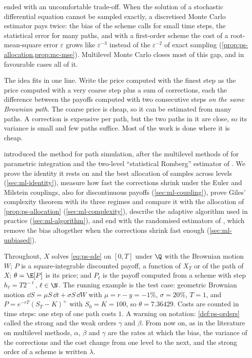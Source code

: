
 ended with an uncomfortable trade-off. When the solution of a
stochastic differential equation cannot be sampled exactly, a discretised Monte Carlo
estimator pays twice: the bias of the scheme calls for small time steps, the statistical
error for many paths, and with a first-order scheme the cost of a root-mean-square error
$\varepsilon$ grows like $\varepsilon^{-3}$ instead of the $\varepsilon^{-2}$ of exact
sampling (\cref{prop:ps-allocation,prop:mc-mse}). Multilevel Monte Carlo closes most of this
gap, and in favourable cases all of it.

The idea fits in one line. Write the price computed with the finest step as the price
computed with a very coarse step plus a sum of corrections, each the difference between the
payoffs computed with two consecutive steps \emph{on the same Brownian path}. The coarse
price is cheap, so it can be estimated from many paths. A correction is expensive per path,
but the two paths in it are close, so its variance is small and few paths suffice. Most of
the work is done where it is cheap.

 introduced the method for path simulation, after the multilevel
methods of \textcite{heinrich-mlmc} for parametric integration and the two-level
``statistical Romberg'' estimator of \textcite{kebaier-romberg}. We prove the identity it
rests on and the best allocation of samples across levels (\cref{sec:ml-identity}), measure
how fast the corrections shrink under the Euler and Milstein couplings, also for
discontinuous payoffs (\cref{sec:ml-coupling}), prove Giles' complexity theorem with its
three regimes and compare it with the allocation of \cref{prop:ps-allocation}
(\cref{sec:ml-complexity}), describe the adaptive algorithm used in practice
(\cref{sec:ml-algorithm}), and end with the randomised estimators of
\textcite{rhee-glynn}, which remove the bias altogether when the corrections shrink fast
enough (\cref{sec:ml-unbiased}).

Throughout, $X$ solves \eqref{eq:ps-sde} on $[0,T]$ under $\Q$ with the Brownian motion $W$;
$P$ is a square-integrable discounted payoff, a function of $X_T$ or of the path of $X$;
$\theta=\E[P]$ is its price; and $P_\ell$ is the payoff computed from a scheme with
step $h_\ell=T2^{-\ell}$, $\ell\in\N$. The running example is the test case: geometric
Brownian motion $\dd S=\mu S\,\dd t+\sigma S\,\dd W$ with $\mu=r-y=-1\%$, $\sigma=20\%$,
$T=1$, and $P=e^{-rT}(S_T-K)^+$ with $S_0=K=100$, so $\theta=7.36429$. Costs are counted in
time steps: one step of one path costs $1$. A warning on notation: \cref{def:ps-orders}
called the strong and the weak orders $\gamma$ and $\beta$. From now on, as in the
literature on multilevel methods, $\alpha$, $\beta$ and $\gamma$ are the rates at which the
bias, the variance of the corrections and the cost change from one level to the next, and
the strong order of a scheme is written $\lambda$.

